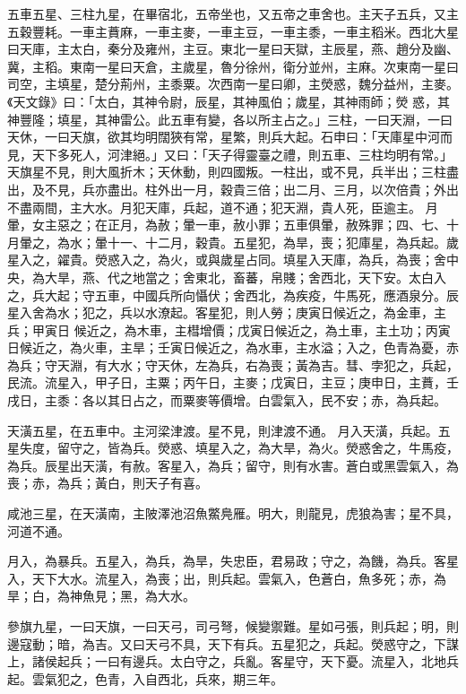 \begin{pinyinscope}
 五車五星、三柱九星，在畢宿北，五帝坐也，又五帝之車舍也。主天子五兵，又主五穀豐耗。一車主蕡麻，一車主麥，一車主豆，一車主黍，一車主稻米。西北大星曰天庫，主太白，秦分及雍州，主豆。東北一星曰天獄，主辰星，燕、趙分及幽、冀，主稻。東南一星曰天倉，主歲星，魯分徐州，衛分並州，主麻。次東南一星曰司空，主填星，楚分荊州，主黍粟。次西南一星曰卿，主熒惑，魏分益州，主麥。《天文錄》曰：「太白，其神令尉，辰星，其神風伯；歲星，其神雨師；熒
 惑，其神豐隆；填星，其神雷公。此五車有變，各以所主占之。」三柱，一曰天淵，一曰天休，一曰天旗，欲其均明闊狹有常，星繁，則兵大起。石申曰：「天庫星中河而見，天下多死人，河津絕。」又曰：「天子得靈臺之禮，則五車、三柱均明有常。」天旗星不見，則大風折木；天休動，則四國叛。一柱出，或不見，兵半出；三柱盡出，及不見，兵亦盡出。柱外出一月，穀貴三倍；出二月、三月，以次倍貴；外出不盡兩間，主大水。月犯天庫，兵起，道不通；犯天淵，貴人死，臣逾主。
 月暈，女主惡之；在正月，為赦；暈一車，赦小罪；五車俱暈，赦殊罪；四、七、十月暈之，為水；暈十一、十二月，穀貴。五星犯，為旱，喪；犯庫星，為兵起。歲星入之，糴貴。熒惑入之，為火，或與歲星占同。填星入天庫，為兵，為喪；舍中央，為大旱，燕、代之地當之；舍東北，畜蕃，帛賤；舍西北，天下安。太白入之，兵大起；守五車，中國兵所向懾伏；舍西北，為疾疫，牛馬死，應酒泉分。辰星入舍為水；犯之，兵以水潦起。客星犯，則人勞；庚寅日候近之，為金車，主兵；甲寅日
 候近之，為木車，主槥增價；戊寅日候近之，為土車，主土功；丙寅日候近之，為火車，主旱；壬寅日候近之，為水車，主水溢；入之，色青為憂，赤為兵；守天淵，有大水；守天休，左為兵，右為喪；黃為吉。彗、孛犯之，兵起，民流。流星入，甲子日，主粟；丙午日，主麥；戊寅日，主豆；庚申日，主蕡，壬戌日，主黍：各以其日占之，而粟麥等價增。白雲氣入，民不安；赤，為兵起。



 天潢五星，在五車中。主河梁津渡。星不見，則津渡不通。
 月入天潢，兵起。五星失度，留守之，皆為兵。熒惑、填星入之，為大旱，為火。熒惑舍之，牛馬疫，為兵。辰星出天潢，有赦。客星入，為兵；留守，則有水害。蒼白或黑雲氣入，為喪；赤，為兵；黃白，則天子有喜。



 咸池三星，在天潢南，主陂澤池沼魚鱉鳧雁。明大，則龍見，虎狼為害；星不具，河道不通。



 月入，為暴兵。五星入，為兵，為旱，失忠臣，君易政；守之，為饑，為兵。客星入，天下大水。流星入，為喪；出，則兵起。雲氣入，色蒼白，魚多死；赤，為
 旱；白，為神魚見；黑，為大水。



 參旗九星，一曰天旗，一曰天弓，司弓弩，候變禦難。星如弓張，則兵起；明，則邊寇動；暗，為吉。又曰天弓不具，天下有兵。五星犯之，兵起。熒惑守之，下謀上，諸侯起兵；一曰有邊兵。太白守之，兵亂。客星守，天下憂。流星入，北地兵起。雲氣犯之，色青，入自西北，兵來，期三年。




\end{pinyinscope}
